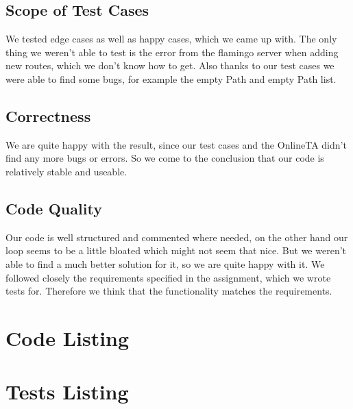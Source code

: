 \documentclass[12pt,a4paper]{article}
\begin{document}
\subsection{Scope of Test Cases}
We tested edge cases as well as happy cases, which we came up with.
The only thing we weren't able to test is the error from the flamingo server when adding new routes, which we don't know how to get.
Also thanks to our test cases we were able to find some bugs, for example the empty Path and empty Path list.

\subsection{Correctness}
We are quite happy with the result, since our test cases and the OnlineTA didn't find any more bugs or errors.
So we come to the conclusion that our code is relatively stable and useable.

\subsection{Code Quality}
Our code is well structured and commented where needed, on the other hand our loop seems to be a little bloated which might not seem that nice. But we weren't able to find a much better solution for it, so we are quite happy with it.
We followed closely the requirements specified in the assignment, which we wrote tests for. Therefore we think that the functionality matches the requirements.


\appendix
\section{Code Listing}

\section{Tests Listing}
\end{document}
